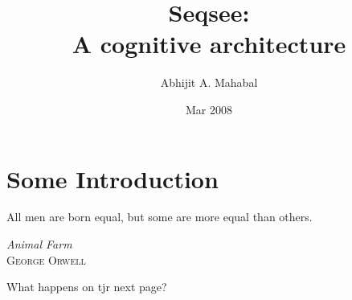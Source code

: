 \documentclass{memoir}
\newcommand{\myepigraph}[3]{\epigraph{#1}{\textit{#2}\\ \textsc{#3}}}
\begin{document}
\frontmatter

\title{Seqsee: \\ A cognitive architecture}
\author{Abhijit A. Mahabal}
\date{Mar 2008}
\thispagestyle{empty}
\maketitle

\clearpage
\tableofcontents

\mainmatter
{}
\pagestyle{companion}


\chapter{Some Introduction}
\myepigraph{All men are born equal, but some are more equal than others.}{Animal Farm}{George Orwell}

What happens on tjr next page?

\newpage

\printindex[sequences]
\end{document}
